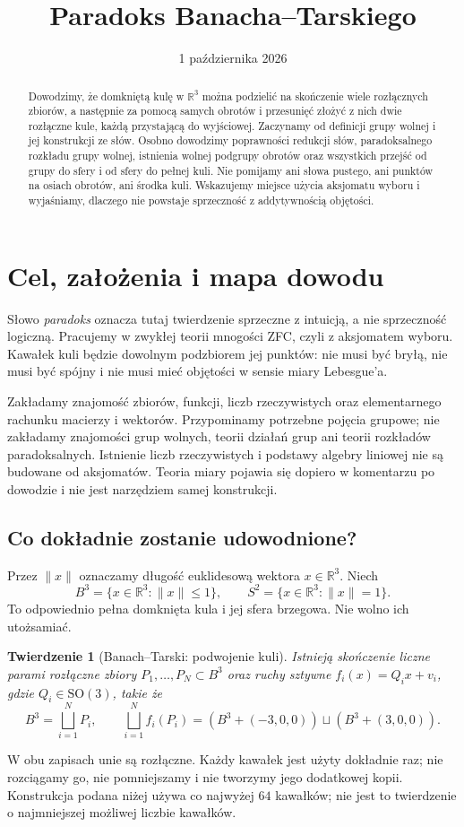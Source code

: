\documentclass[11pt,a4paper]{article}
\title{Paradoks Banacha--Tarskiego}
\author{}
\date{1 października 2026}
\numberwithin{equation}{section}
\theoremstyle{plain}
\newtheorem{twierdzenie}{Twierdzenie}[section]
\theoremstyle{definition}
\theoremstyle{remark}
\newcommand{\R}{\mathbb R}
\begin{document}
\maketitle
\begin{abstract}
Dowodzimy, że domkniętą kulę w $\R^3$ można podzielić na skończenie wiele rozłącznych zbiorów, a następnie za pomocą samych obrotów i przesunięć złożyć z nich dwie rozłączne kule, każdą przystającą do wyjściowej. Zaczynamy od definicji grupy wolnej i jej konstrukcji ze słów. Osobno dowodzimy poprawności redukcji słów, paradoksalnego rozkładu grupy wolnej, istnienia wolnej podgrupy obrotów oraz wszystkich przejść od grupy do sfery i od sfery do pełnej kuli. Nie pomijamy ani słowa pustego, ani punktów na osiach obrotów, ani środka kuli. Wskazujemy miejsce użycia aksjomatu wyboru i wyjaśniamy, dlaczego nie powstaje sprzeczność z addytywnością objętości.
\end{abstract}
\tableofcontents

\section{Cel, założenia i mapa dowodu}
Słowo \emph{paradoks} oznacza tutaj twierdzenie sprzeczne z intuicją, a nie sprzeczność logiczną. Pracujemy w zwykłej teorii mnogości ZFC, czyli z aksjomatem wyboru. Kawałek kuli będzie dowolnym podzbiorem jej punktów: nie musi być bryłą, nie musi być spójny i nie musi mieć objętości w sensie miary Lebesgue'a.

Zakładamy znajomość zbiorów, funkcji, liczb rzeczywistych oraz elementarnego rachunku macierzy i wektorów. Przypominamy potrzebne pojęcia grupowe; nie zakładamy znajomości grup wolnych, teorii działań grup ani teorii rozkładów paradoksalnych. Istnienie liczb rzeczywistych i podstawy algebry liniowej nie są budowane od aksjomatów. Teoria miary pojawia się dopiero w komentarzu po dowodzie i nie jest narzędziem samej konstrukcji.

\subsection{Co dokładnie zostanie udowodnione?}
Przez $\|x\|$ oznaczamy długość euklidesową wektora $x\in\R^3$. Niech
\[
 B^3=\{x\in\R^3:\|x\|\le1\},\qquad S^2=\{x\in\R^3:\|x\|=1\}.
\]
To odpowiednio pełna domknięta kula i jej sfera brzegowa. Nie wolno ich utożsamiać.

\begin{twierdzenie}[Banach--Tarski: podwojenie kuli]\label{tw:banach-tarski}
Istnieją skończenie liczne parami rozłączne zbiory $P_1,\ldots,P_N\subset B^3$ oraz ruchy sztywne $f_i(x)=Q_ix+v_i$, gdzie $Q_i\in\mathrm{SO}(3)$, takie że
\[
 B^3=\bigsqcup_{i=1}^{N}P_i,\qquad
 \bigsqcup_{i=1}^{N}f_i(P_i)
 =(B^3+(-3,0,0))\sqcup(B^3+(3,0,0)).
\]
\end{twierdzenie}
W obu zapisach unie są rozłączne. Każdy kawałek jest użyty dokładnie raz; nie rozciągamy go, nie pomniejszamy i nie tworzymy jego dodatkowej kopii. Konstrukcja podana niżej używa co najwyżej $64$ kawałków; nie jest to twierdzenie o najmniejszej możliwej liczbie kawałków.
\end{document}
